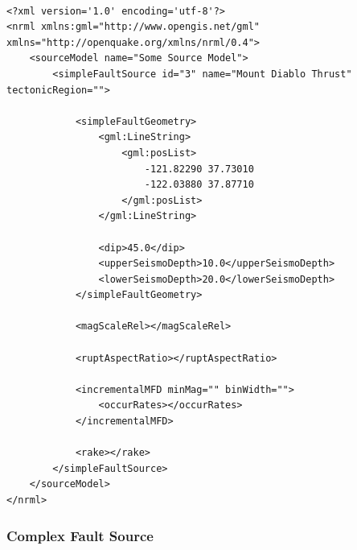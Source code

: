 \begin{Verbatim}[frame=single, commandchars=\\\{\}, fontsize=\scriptsize, samepage=true]

<?xml version='1.0' encoding='utf-8'?>
<nrml xmlns:gml="http://www.opengis.net/gml" xmlns="http://openquake.org/xmlns/nrml/0.4">
    <sourceModel name="Some Source Model">
        <simpleFaultSource id="3" name="Mount Diablo Thrust" tectonicRegion="">

            <simpleFaultGeometry>
                <gml:LineString>
                    <gml:posList>
                        -121.82290 37.73010
                        -122.03880 37.87710
                    </gml:posList>
                </gml:LineString>

                <dip>45.0</dip>
                <upperSeismoDepth>10.0</upperSeismoDepth>
                <lowerSeismoDepth>20.0</lowerSeismoDepth>
            </simpleFaultGeometry>

            <magScaleRel></magScaleRel>

            <ruptAspectRatio></ruptAspectRatio>

            <incrementalMFD minMag="" binWidth="">
                <occurRates></occurRates>
            </incrementalMFD>

            <rake></rake>
        </simpleFaultSource>
    </sourceModel>
</nrml>

\end{Verbatim}


\subsubsection{Complex Fault Source}

